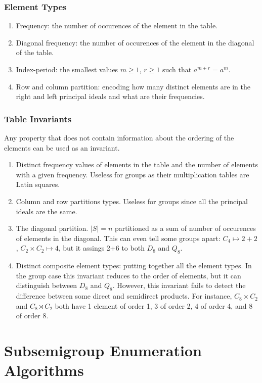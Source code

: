 \documentclass{amsart}
\theoremstyle{plain}
\theoremstyle{definition}
\begin{document}
\subsubsection{Element Types}

\begin{enumerate}
\item Frequency: the number of occurences of the element in the table.
\item Diagonal frequency: the number of occurences of the element in the diagonal of the table.
\item Index-period: the smallest values $m\geq 1$, $r\geq 1$ such that $a^{m+r}=a^m$.
\item Row and column partition: encoding how many distinct elements are in the right and left principal ideals and what are their frequencies.
\end{enumerate} 

\subsubsection{Table Invariants}

Any property that does not contain information about the ordering of the elements can be used as an invariant.
\begin{enumerate}
\item Distinct frequency values of elements in the table and the number of elements with a given frequency. Useless for groups as their multiplication tables are Latin squares.
\item Column and row partitions types.   Useless for groups since all the principal ideals are the same.
\item The diagonal partition. $|S|=n$ partitioned as a sum of number of occurences of elements in the diagonal. This can even tell some groups apart: $C_4\mapsto 2+2$, $C_2\times C_2\mapsto 4$, but it assings 2+6 to both $D_8$ and $Q_8$.
\item Distinct composite element types: putting together all the element types. In the group case this invariant reduces to the order of elements, but it can distinguish between $D_8$ and $Q_8$. However, this invariant fails to detect the difference between some direct and semidirect products. For instance, $C_8\times C_2$ and $C_8\rtimes C_2$ both have 1 element of order 1, 3 of order 2, 4 of order 4, and 8 of order 8.
\end{enumerate} 



\section{Subsemigroup Enumeration Algorithms}
\label{sec:enum}
\end{document}
